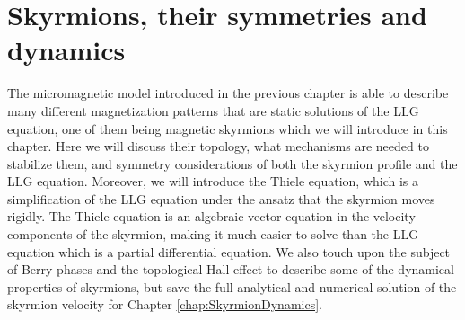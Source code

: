 \chapter{Skyrmions, their symmetries and dynamics} \label{chap:Skyrmions}
The micromagnetic model introduced in the previous chapter is able to describe many different magnetization patterns that are static solutions of the LLG equation, one of them being magnetic skyrmions which we will introduce in this chapter. Here we will discuss their topology, what mechanisms are needed to stabilize them, and symmetry considerations of both the skyrmion profile and the LLG equation. Moreover, we will introduce the Thiele equation, which is a simplification of the LLG equation under the ansatz that the skyrmion moves rigidly. The Thiele equation is an algebraic vector equation in the velocity components of the skyrmion, making it much easier to solve than the LLG equation which is a partial differential equation. We also touch upon the subject of Berry phases and the topological Hall effect to describe some of the dynamical properties of skyrmions, but save the full analytical and numerical solution of the skyrmion velocity for Chapter \ref{chap:SkyrmionDynamics}.


